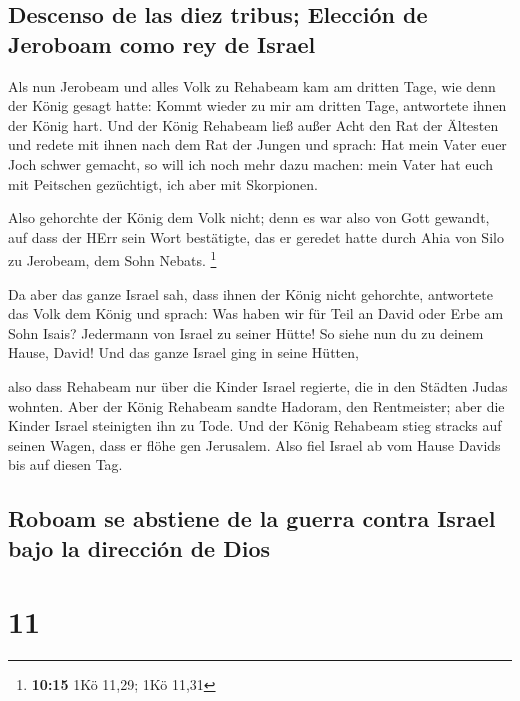 \hypertarget{descenso-de-las-diez-tribus-elecciuxf3n-de-jeroboam-como-rey-de-israel}{%
\subsection{Descenso de las diez tribus; Elección de Jeroboam como rey
de
Israel}\label{descenso-de-las-diez-tribus-elecciuxf3n-de-jeroboam-como-rey-de-israel}}

 Als nun Jerobeam und alles Volk zu Rehabeam kam am
dritten Tage, wie denn der König gesagt hatte: Kommt wieder zu mir am
dritten Tage,  antwortete ihnen der König hart. Und der
König Rehabeam ließ außer Acht den Rat der Ältesten  und
redete mit ihnen nach dem Rat der Jungen und sprach: Hat mein Vater euer
Joch schwer gemacht, so will ich noch mehr dazu machen: mein Vater hat
euch mit Peitschen gezüchtigt, ich aber mit Skorpionen.

 Also gehorchte der König dem Volk nicht; denn es war
also von Gott gewandt, auf dass der HErr sein Wort bestätigte, das er
geredet hatte durch Ahia von Silo zu Jerobeam, dem Sohn Nebats.
\footnote{\textbf{10:15} 1Kö 11,29; 1Kö 11,31}

 Da aber das ganze Israel sah, dass ihnen der König nicht
gehorchte, antwortete das Volk dem König und sprach: Was haben wir für
Teil an David oder Erbe am Sohn Isais? Jedermann von Israel zu seiner
Hütte! So siehe nun du zu deinem Hause, David! Und das ganze Israel ging
in seine Hütten,

 also dass Rehabeam nur über die Kinder Israel regierte,
die in den Städten Judas wohnten.  Aber der König
Rehabeam sandte Hadoram, den Rentmeister; aber die Kinder Israel
steinigten ihn zu Tode. Und der König Rehabeam stieg stracks auf seinen
Wagen, dass er flöhe gen Jerusalem.  Also fiel Israel ab
vom Hause Davids bis auf diesen Tag.

\hypertarget{roboam-se-abstiene-de-la-guerra-contra-israel-bajo-la-direcciuxf3n-de-dios}{%
\subsection{Roboam se abstiene de la guerra contra Israel bajo la
dirección de
Dios}\label{roboam-se-abstiene-de-la-guerra-contra-israel-bajo-la-direcciuxf3n-de-dios}}

\hypertarget{section-10}{%
\section{11}\label{section-10}}

